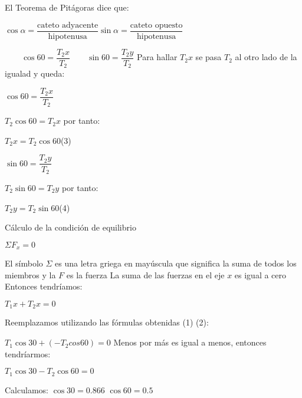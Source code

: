 \documentclass{article}
\begin{document}
El Teorema de Pit\'agoras dice que:\newline

\qquad $\cos \alpha = \dfrac{\text{cateto adyacente}}{\text{hipotenusa}}$\qquad $\sin \alpha = \dfrac{\text{cateto opuesto}}{\text{hipotenusa}}$\newline\newline


\begin{math}
  \qquad \cos 60 = \dfrac{T_2x}{T_2}
  \qquad \sin 60 = \dfrac{T_2y}{T_2}
\end{math}\newline
Para hallar $T_2x$ se pasa $T_2$ al otro lado de la igualad y queda:\newline

$\cos 60 = \dfrac{T_2x}{T_2}$

$T_2 \cos 60 = T_2x$ por tanto:

$T_2x = T_2 \cos 60$\qquad (3)\newline


$\sin 60 = \dfrac{T_2y}{T_2}$

$T_2 \sin 60 = T_2y$ por tanto:

$T_2y = T_2 \sin 60$\qquad (4)\newline


C\'alculo de la condici\'on de equilibrio\newline

\qquad $\Sigma F_x = 0$\newline

El s\'imbolo $\Sigma$ es una letra griega en may\'uscula que significa la suma de todos los miembros y la $F$ es la fuerza\newline
La suma de las fuerzas en el eje $x$ es igual a cero\newline
Entonces tendr\'iamos:\newline

\qquad $T_1x + T_2x = 0$\newline

Reemplazamos utilizando las f\'ormulas obtenidas (1) (2):\newline

\qquad $T_1 \cos 30 + (- T_2 cos 60) = 0$\newline
Menos por m\'as es igual a menos, entonces tendr\'iarmos:\newline

\qquad $T_1 \cos 30 - T_2 \cos 60 = 0$\newline

Calculamos:\newline
$\cos 30 = 0.866$\newline
$\cos 60 = 0.5$\newline
\end{document}
